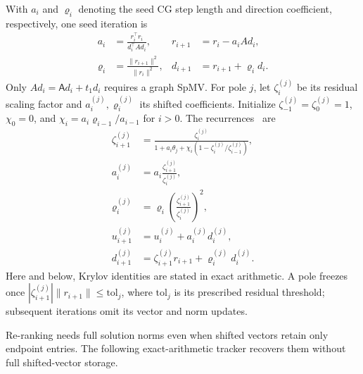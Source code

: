 \documentclass[conference]{IEEEtran}
\theoremstyle{definition}
\newcommand{\matA}{\mathsf A}
\begin{document}
With $a_i$ and ${\varrho}_i$ denoting the seed CG
step length and direction coefficient, respectively,
one seed iteration is
\begin{align}
 a_i&=\frac{r_i^\top r_i}{d_i^\top A d_i},&
 r_{i+1}&=r_i-a_i A d_i,\\
 {\varrho}_i&=\frac{\|r_{i+1}\|^2}{\|r_i\|^2},&
 d_{i+1}&=r_{i+1}+{\varrho}_i d_i.
\label{eq:seed-cg}
\end{align}
Only $A d_i={\matA} d_i+t_1d_i$ requires a graph SpMV.
For pole $j$, let $\zeta_i^{(j)}$ be its residual
scaling factor and $a_i^{(j)},{\varrho}_i^{(j)}$
its shifted coefficients. Initialize
$\zeta_{-1}^{(j)}=\zeta_0^{(j)}=1$, $\chi_0=0$,
and $\chi_i=a_i{\varrho}_{i-1}/a_{i-1}$ for $i>0$.
The recurrences~\cite{jegerlehner1996} are
\begin{align}
 \zeta_{i+1}^{(j)}
 &=\frac{\zeta_i^{(j)}}{1+a_i\theta_j+
       \chi_i(1-\zeta_i^{(j)}/\zeta_{i-1}^{(j)})},\\
 a_i^{(j)}&=a_i\frac{\zeta_{i+1}^{(j)}}{\zeta_i^{(j)}},\\
 {\varrho}_i^{(j)}&={\varrho}_i\left(\frac{\zeta_{i+1}^{(j)}}{\zeta_i^{(j)}}\right)^2,\\
 u_{i+1}^{(j)}&=u_i^{(j)}+a_i^{(j)}d_i^{(j)},\\
 d_{i+1}^{(j)}&=\zeta_{i+1}^{(j)}r_{i+1}+{\varrho}_i^{(j)}d_i^{(j)}.
\label{eq:shifted-cg}
\end{align}
Here and below, Krylov identities are stated in
exact arithmetic. A pole freezes once
$|\zeta_{i+1}^{(j)}|\|r_{i+1}\|\le{\mathrm{tol}}_j$,
where ${\mathrm{tol}}_j$ is its prescribed residual
threshold; subsequent iterations omit its
vector and norm updates.


Re-ranking needs full solution norms even when shifted vectors retain
only endpoint entries. The following exact-arithmetic tracker recovers
them without full shifted-vector storage.
\end{document}
